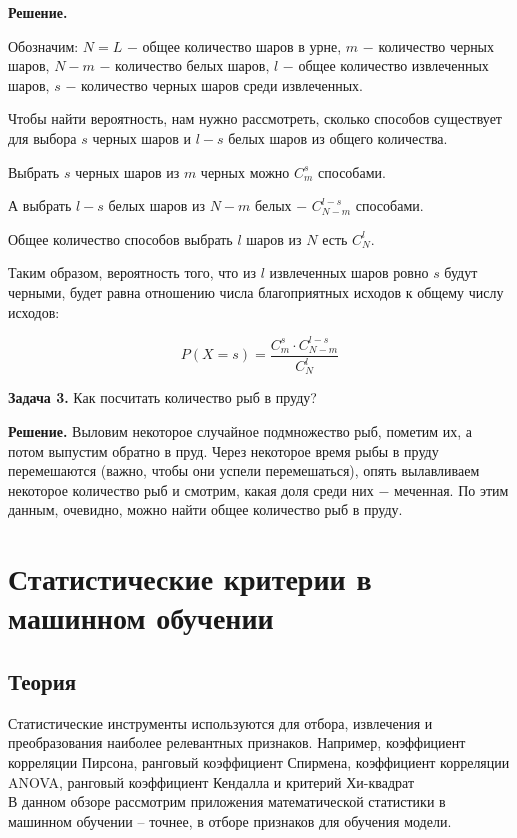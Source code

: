 \textbf{Решение.}

Обозначим:
$N = L$ $-$ общее количество шаров в урне,
$m$ $-$ количество черных шаров,
$N - m$ $-$ количество белых шаров,
$l$ $-$ общее количество извлеченных шаров,
$s$ $-$ количество черных шаров среди извлеченных.

Чтобы найти вероятность, нам нужно рассмотреть, сколько способов существует для выбора $s$ черных шаров и $l - s$ белых шаров из общего количества.

Выбрать $s$ черных шаров из $m$ черных можно $C_m^s$ способами.

А выбрать $l - s$ белых шаров из $N - m$ белых $-$ $ C_{N - m}^{l - s}$ способами.

Общее количество способов выбрать $l$ шаров из $N$ есть $C_N^l$.

Таким образом, вероятность того, что из $l$ извлеченных шаров ровно $s$ будут черными, будет равна отношению числа благоприятных исходов к общему числу исходов:

$$
P(X = s) = \frac{C_{m}^{s} \cdot C_{N - m}^{l - s}}{C_{N}^{l}}
$$

\textbf{Задача 3.} Как посчитать количество рыб в пруду?

\textbf{Решение.} Выловим некоторое случайное подмножество рыб, пометим их, а потом выпустим обратно в пруд. Через некоторое время рыбы в пруду перемешаются (важно, чтобы они успели перемешаться), опять вылавливаем некоторое количество рыб и смотрим, какая доля среди них $-$ меченная. По этим данным, очевидно, можно найти общее количество рыб в пруду.


\section{Статистические критерии в машинном обучении}
\subsection{Теория}

Статистические инструменты используются для отбора, извлечения и преобразования наиболее релевантных признаков. Например, коэффициент корреляции Пирсона, ранговый коэффициент Спирмена, коэффициент корреляции ANOVA, ранговый коэффициент Кендалла и критерий  Хи-квадрат \\

В данном обзоре рассмотрим приложения математической статистики в машинном обучении – точнее, в отборе признаков для обучения модели.  \\

